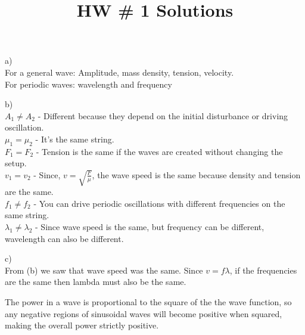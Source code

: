 \documentclass[10pt]{article}
\newenvironment{problem}[2][Problem]{\begin{trivlist}
\item[\hskip \labelsep {\bfseries #1}\hskip \labelsep {\bfseries #2.}]}{\end{trivlist}}
\begin{document}
 \title{HW \# 1 Solutions}
\date{}
\maketitle
 
\begin{problem}{1}
\item
a)\\
For a general wave: Amplitude, mass density, tension, velocity.\\
For periodic waves: wavelength and frequency
\item
b)\\
$A_1 \neq A_2$ - Different because they depend on the initial disturbance or driving oscillation.\\
$\mu_1 = \mu_2$ - It's the same string.\\
$F_1 = F_2$ - Tension is the same if the waves are created without changing the setup.\\
$v_1 = v_2$ - Since, $v = \sqrt{\frac{F}{\mu}}$, the wave speed is the same because density and tension are the same.\\
$f_1 \neq f_2$ - You can drive periodic oscillations with different frequencies on the same string.\\
$\lambda_1 \neq \lambda_2$ - Since wave speed is the same, but frequency can be different, wavelength can also be different.
\item
c)\\
From (b) we saw that wave speed was the same. Since $v = f\lambda$, if the frequencies are the same then lambda must also be the same.
\end{problem}

\begin{problem}{2}
The power in a wave is proportional to the square of the the wave function, so any negative regions of sinusoidal waves will become positive when squared, making the overall power strictly positive.
\end{problem}
\end{document}
